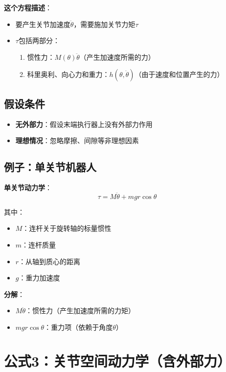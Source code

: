 \documentclass[12pt,a4paper]{article}
\begin{document}
\textbf{这个方程描述}：
\begin{itemize}
\item 要产生关节加速度$\ddot{\theta}$，需要施加关节力矩$\tau$
\item $\tau$包括两部分：
\begin{enumerate}
\item 惯性力：$M(\theta)\ddot{\theta}$（产生加速度所需的力）
\item 科里奥利、向心力和重力：$h(\theta, \dot{\theta})$（由于速度和位置产生的力）
\end{enumerate}
\end{itemize}

\subsection{假设条件}

\begin{itemize}
\item \textbf{无外部力}：假设末端执行器上没有外部力作用
\item \textbf{理想情况}：忽略摩擦、间隙等非理想因素
\end{itemize}

\subsection{例子：单关节机器人}

\textbf{单关节动力学}：
\begin{equation}
\tau = M\ddot{\theta} + mgr\cos\theta \tag{11.19}
\end{equation}

其中：
\begin{itemize}
\item $M$：连杆关于旋转轴的标量惯性
\item $m$：连杆质量
\item $r$：从轴到质心的距离
\item $g$：重力加速度
\end{itemize}

\textbf{分解}：
\begin{itemize}
\item $M\ddot{\theta}$：惯性力（产生加速度所需的力矩）
\item $mgr\cos\theta$：重力项（依赖于角度$\theta$）
\end{itemize}

\section{公式3：关节空间动力学（含外部力）}
\end{document}
